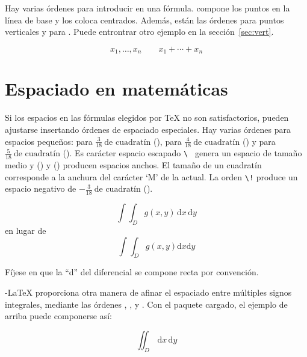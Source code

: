  Hay varias órdenes para introducir \textbf{} en una fórmula.  compone los puntos en la línea de base y  los coloca centrados.  Además, están las órdenes  para puntos verticales y  para . Puede entrontrar otro ejemplo en la sección~\ref{sec:vert}.
 \begin{example}
 \begin{displaymath}
 x_{1},\ldots,x_{n} \qquad
 x_{1}+\cdots+x_{n}
 \end{displaymath}
 \end{example}
 
\section{Espaciado en matemáticas}

Si los espacios en las fórmulas elegidos por \TeX{} no son satisfactorios, pueden ajustarse insertando órdenes de espaciado especiales.  Hay varias órdenes para espacios pequeños: \ci{,} para $\frac{3}{18}\:\textrm{de cuadratín}$ (\demowidth{0.166em}), \ci{:} para $\frac{4}{18}\: \textrm{de cuadratín}$ (\demowidth{0.222em}) y \ci{;} para $\frac{5}{18}\: \textrm{de cuadratín}$ (\demowidth{0.277em}).  Es carácter espacio escapado \verb*.\ . genera un espacio de tamaño medio y  (\demowidth{1em}) y  (\demowidth{2em}) producen espacios anchos.  El tamaño de un cuadratín  corresponde a la anchura del carácter `M' de la \fontnomo{} actual.  La orden \verb|\!| produce un espacio negativo de $-\frac{3}{18}\:\textrm{de cuadratín}$
(\demowidth{0.166em}).
\begin{example}
\newcommand{\ud}{\mathrm{d}}
\begin{displaymath}
\int\!\!\!\int_{D} g(x,y)
  \, \ud x\, \ud y 
\end{displaymath}
en lugar de
\begin{displaymath}
\int\int_{D} g(x,y)\ud x \ud y
\end{displaymath}
\end{example}
Fíjese en que la ``d'' del diferencial se compone recta por convención.

\AmS-\LaTeX{} proporciona otra manera de afinar el espaciado entre múltiples signos integrales, mediante las órdenes , ,  y .  Con el paquete  cargado, el ejemplo de arriba puede componerse así:
\begin{example}
\newcommand{\ud}{\mathrm{d}}
\begin{displaymath}
\iint_{D} \, \ud x \, \ud y
\end{displaymath}
\end{example}

